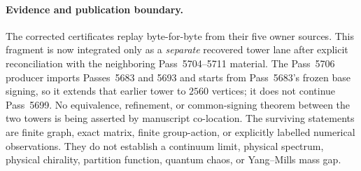 \paragraph{Evidence and publication boundary.}
The corrected certificates replay byte-for-byte from their five owner sources.
This fragment is now integrated only as a \emph{separate} recovered tower lane after explicit reconciliation with the neighboring Pass~5704--5711 material.  The Pass~5706 producer imports Passes~5683 and 5693 and starts from Pass~5683's frozen base signing, so it extends that earlier tower to $2560$ vertices; it does not continue Pass~5699.  No equivalence, refinement, or common-signing theorem between the two towers is being asserted by manuscript co-location.  The surviving statements are finite graph, exact matrix, finite group-action, or explicitly labelled numerical observations.  They do not establish a continuum limit, physical spectrum, physical chirality, partition function, quantum chaos, or Yang--Mills mass gap.
